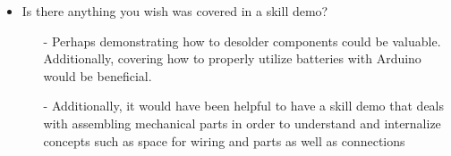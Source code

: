 \documentclass[12pt]{article}
\begin{document}
\begin{itemize}
\begin{itemize}
\begin{itemize}
        \end{itemize}
        \item Is there anything you wish was covered in a skill demo?
        \begin{itemize}
            \item[-] Perhaps demonstrating how to desolder components could be valuable. Additionally, covering how to properly utilize batteries with Arduino would be beneficial.
            \item[-] Additionally, it would have been helpful to have a skill demo that deals with assembling mechanical parts in order to understand and internalize concepts such as space for wiring and parts as well as connections
        \end{itemize}
    \end{itemize}
\end{itemize}
\end{document}
